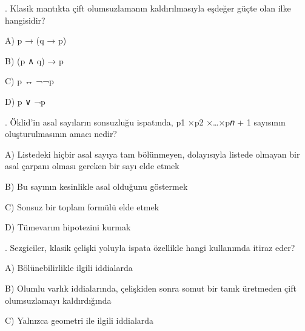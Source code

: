 \par\smallskip{}. Klasik mantıkta çift olumsuzlamanın kaldırılmasıyla eşdeğer güçte olan ilke hangisidir?

\par\noindent\hspace*{1.6em}A) p → (q → p)

\par\noindent\hspace*{1.6em}B) (p ∧ q) → p

\par\noindent\hspace*{1.6em}C) p ↔ ¬¬p

\par\noindent\hspace*{1.6em}D) p ∨ ¬p

\par\smallskip{}. Öklid’in asal sayıların sonsuzluğu ispatında, p1 ×p2 ×…×p𝑛 + 1 sayısının oluşturulmasının amacı nedir?

\par\noindent\hspace*{1.6em}A) Listedeki hiçbir asal sayıya tam bölünmeyen, dolayısıyla listede olmayan bir asal çarpanı olması gereken bir sayı elde etmek

\par\noindent\hspace*{1.6em}B) Bu sayının kesinlikle asal olduğunu göstermek

\par\noindent\hspace*{1.6em}C) Sonsuz bir toplam formülü elde etmek

\par\noindent\hspace*{1.6em}D) Tümevarım hipotezini kurmak

\par\smallskip{}. Sezgiciler, klasik çelişki yoluyla ispata özellikle hangi kullanımda itiraz eder?

\par\noindent\hspace*{1.6em}A) Bölünebilirlikle ilgili iddialarda

\par\noindent\hspace*{1.6em}B) Olumlu varlık iddialarında, çelişkiden sonra somut bir tanık üretmeden çift olumsuzlamayı kaldırdığında

\par\noindent\hspace*{1.6em}C) Yalnızca geometri ile ilgili iddialarda

